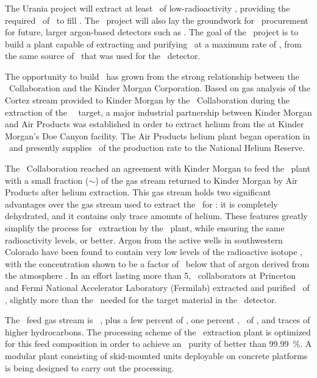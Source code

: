 \subsubsection{\Urania}
The Urania project will extract at least \UraniaTotalDSkProduction\ of low-radioactivity \UAr, providing the required \DSkTotalMass\ of \UAr\ to fill \DSk.   The \Urania\ project will also lay the groundwork for \UAr\ procurement for future, larger argon-based detectors such as \Argo.  The goal of the \Urania\ project is to build a plant capable of extracting and purifying \UAr\ at a maximum rate of \UraniaUArRate, from the same source of \UAr\ that was used for the \DSf\ detector.  

The opportunity to build \Urania\ has grown from the strong relationship between the \DS\ Collaboration and the Kinder Morgan Corporation. Based on gas analysis of the Cortez stream provided to Kinder Morgan by the \DS\ Collaboration during the extraction of the \DSf\ \UAr\ target, a major industrial partnership between Kinder Morgan and Air Products was established in order to extract helium from the  at Kinder Morgan's Doe Canyon facility.  The Air Products helium plant began operation in \UraniaHeStartDate\ and presently supplies \UraniaHeNationalReserveFractionEquivalentRate\ of the production rate to the National Helium Reserve. 

The \DS\ Collaboration reached an agreement with Kinder Morgan to feed the \Urania\ plant with a small fraction ($\sim$\UraniaGasFeedFraction) of the gas stream returned to Kinder Morgan by Air Products after helium extraction.  This gas stream holds two significant advantages over the gas stream used to extract the \UAr\ for \DSf: it is completely dehydrated,  and it contains only trace amounts of helium. These features greatly simplify the process for \UAr\ extraction by the \Urania\ plant, while ensuring the same radioactivity levels, or better.  Argon from the active  wells in southwestern Colorado have been found to contain very low levels of the radioactive isotope  , with the concentration shown to be a factor of \DSfUArArThreeNineDepletion\ below that of argon derived from the atmosphere \cite{Agnes:2016fz}. In an effort lasting more than \SI{5}{\years}, \DSf\ collaborators at Princeton and Fermi National Accelerator Laboratory (Fermilab) extracted and purified \DSfUArMassDelivered\ of \UAr, slightly more than the  \DSfTotalMass\ needed for the target material in the \DSf\ detector. 

The \Urania\ feed gas stream is \UraniaCOTwoFeedFraction\ , plus a few percent of , one percent , \UraniaArFeedFraction\ of \UAr, and traces of higher hydrocarbons.  The processing scheme of the \UAr\ extraction plant is optimized for this feed composition in order to achieve an \UAr\ purity of better than \SI{99.99}{\percent}.  A modular plant consisting of skid-mounted units deployable on concrete platforms is being designed to carry out the processing.

